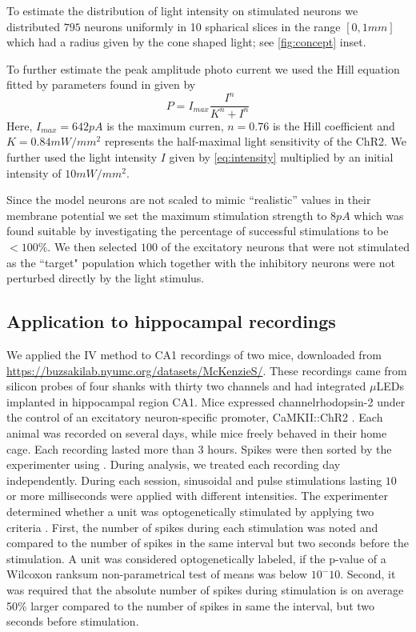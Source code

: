 \documentclass[11pt]{article}
\begin{document}
To estimate the distribution of light intensity on stimulated neurons we distributed $ 795 $ neurons uniformly in 10 spharical slices in the range $[0, 1 mm]$ which had a radius given by the cone shaped light; see \ref{fig:concept} inset.

To further estimate the peak amplitude photo current we used the Hill equation fitted by parameters found in \citet{wang2007high} given by 
\begin{equation}
    P = I_{max} \frac{I^n}{K^n + I^n}
\label{eq:hill}
\end{equation}
Here, $I_{max} = 642 pA$ is the maximum curren, $n=0.76$ is the Hill coefficient and $K = 0.84 mW/mm^2$ represents the half-maximal light sensitivity of the ChR2. 
We further used the light intensity $I$ given by \cref{eq:intensity} multiplied by an initial intensity of $10mW/mm^2$. 

Since the model neurons are not scaled to mimic ``realistic'' values in their membrane potential we set the maximum stimulation strength to $ 8 pA $ which was found suitable by investigating the percentage of successful stimulations to be $ < 100\% $. 
We then selected $ 100 $ of the excitatory neurons that were not stimulated as the ``target" population which together with the inhibitory neurons were not perturbed directly by the light stimulus.

\subsection{Application to hippocampal recordings}\label{sec:method:realdata}
We applied the IV method to CA1 recordings of two mice, downloaded from \url{https://buzsakilab.nyumc.org/datasets/McKenzieS/}.
These recordings came from silicon probes of four shanks with thirty two channels and had integrated $\mu$LEDs implanted in hippocampal region CA1.
Mice expressed channelrhodopsin-2 under the control of an excitatory neuron-specific promoter, CaMKII::ChR2 \citep{English2017}.
Each animal was recorded on several days, while mice freely behaved in their home cage.
Each recording lasted more than $3$ hours.
Spikes were then sorted by the experimenter using .
During analysis, we treated each recording day independently.
During each session, sinusoidal and pulse stimulations lasting $10$ or more milliseconds were applied with different intensities.
The experimenter determined whether a unit was optogenetically stimulated by applying two criteria \citep{English2017}.
First, the number of spikes during each stimulation was noted and compared to the number of spikes in the same interval but two seconds before the stimulation.
A unit was considered optogenetically labeled, if the p-value of a Wilcoxon ranksum non-parametrical test of means was below $10^-10$.
Second, it was required that the absolute number of spikes during stimulation is on average 50\% larger compared to the number of spikes in same the interval, but two seconds before stimulation.
\end{document}
